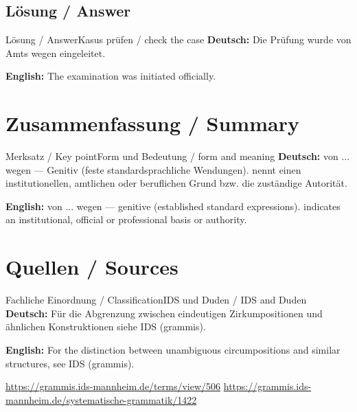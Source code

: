 \documentclass[a4paper,11pt]{article}
\newcommand{\GermanText}[1]{\textbf{Deutsch: }#1\par}
\newcommand{\EnglishText}[1]{{\small\color{SoftGray}\textbf{English: }#1\par}}
\begin{document}
\subsection{Lösung / Answer}
\begin{grammarentry}{Lösung / Answer}{Kasus prüfen / check the case}
\GermanText{Die Prüfung wurde von Amts wegen eingeleitet.}
\EnglishText{The examination was initiated officially.}
\end{grammarentry}
\section{Zusammenfassung / Summary}
\begin{grammarentry}{Merksatz / Key point}{Form und Bedeutung / form and meaning}
\GermanText{von ... wegen — Genitiv (feste standardsprachliche Wendungen). nennt einen institutionellen, amtlichen oder beruflichen Grund bzw. die zuständige Autorität.}
\EnglishText{von ... wegen — genitive (established standard expressions). indicates an institutional, official or professional basis or authority.}
\end{grammarentry}
\section{Quellen / Sources}
\begin{grammarentry}{Fachliche Einordnung / Classification}{IDS und Duden / IDS and Duden}
\GermanText{Für die Abgrenzung zwischen eindeutigen Zirkumpositionen und ähnlichen Konstruktionen siehe IDS (grammis).}
\EnglishText{For the distinction between unambiguous circumpositions and similar structures, see IDS (grammis).}
\url{https://grammis.ids-mannheim.de/terms/view/506}
\url{https://grammis.ids-mannheim.de/systematische-grammatik/1422}
\end{grammarentry}
\end{document}
